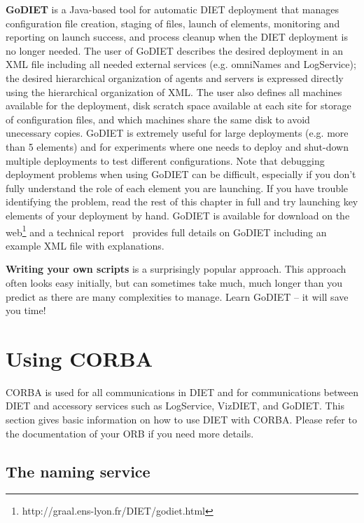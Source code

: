 \textbf{GoDIET} is a Java-based tool for automatic DIET deployment
that manages configuration file creation, staging of files, launch
of elements, monitoring and reporting on launch success, and process
cleanup when the DIET deployment is no longer needed. The user of
GoDIET describes the desired deployment in an XML file including all
needed external services (e.g. omniNames and LogService); the
desired hierarchical organization of agents and servers is expressed
directly using the hierarchical organization of XML.  The user also
defines all machines available for the deployment, disk scratch
space available at each site for storage of configuration files, and
which machines share the same disk to avoid unecessary copies.
GoDIET is extremely useful for large deployments (e.g. more than 5
elements) and for experiments where one needs to deploy and
shut-down multiple deployments to test different configurations.
Note that debugging deployment problems when using GoDIET can be
difficult, especially if you don't fully understand the role of each
element you are launching.  If you have trouble identifying the
problem, read the rest of this chapter in full and try launching key
elements of your deployment by hand.  GoDIET is available for
download on the web\footnote{http://graal.ens-lyon.fr/DIET/godiet.html}
and a technical report~\cite{CDa05} provides full details on GoDIET
including an example XML file with explanations.

\textbf{Writing your own scripts} is a surprisingly popular
approach.  This approach often looks easy initially, but can
sometimes take much, much longer than you predict as there are many
complexities to manage.  Learn GoDIET -- it will save you time!

\section{Using CORBA} 
\label{sec:CORBA_services}

CORBA is used for all communications in DIET and for communications
between DIET and accessory services such as LogService, VizDIET, and
GoDIET.  This section gives basic information on how to use DIET
with CORBA.  Please refer to the documentation of your ORB if you
need more details.

\subsection{The naming service}

